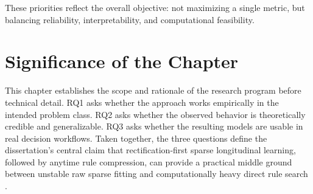 These priorities reflect the overall objective: not maximizing a single metric, but balancing reliability, interpretability, and computational feasibility.

\section{Significance of the Chapter}

This chapter establishes the scope and rationale of the research program before technical detail. RQ1 asks whether the approach works empirically in the intended problem class. RQ2 asks whether the observed behavior is theoretically credible and generalizable. RQ3 asks whether the resulting models are usable in real decision workflows. Taken together, the three questions define the dissertation's central claim that rectification-first sparse longitudinal learning, followed by anytime rule compression, can provide a practical middle ground between unstable raw sparse fitting and computationally heavy direct rule search \autocites{orender2022,JOrender2025Efficient,JOrender2025Anytime}.
